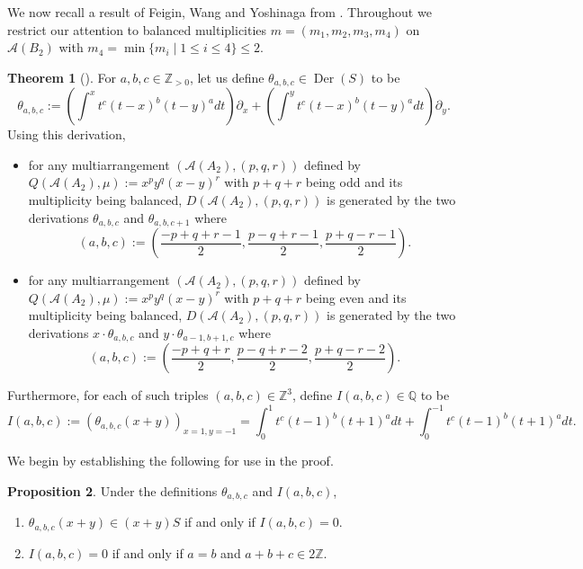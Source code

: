\documentclass[12pt]{amsart}
\theoremstyle{definition}
\newtheorem{theorem}{Theorem}[section]
\newtheorem{proposition}[theorem]{Proposition}
\theoremstyle{remark}
\newcommand{\Der}{\operatorname{Der}}
\newcommand\CA{{\mathscr A}}
\newcommand\ZZ{{\mathbb Z}}
\newcommand\QQ{{\mathbb Q}}
\begin{document}
We now recall a result of Feigin, Wang and Yoshinaga from \cite{2309.01287}. Throughout we restrict our attention to balanced multiplicities $m=(m_1,m_2,m_3,m_4)$ on $\CA(B_2)$ with $m_4=\min\{m_i\mid 1\leq i \leq 4\}\leq2$.
\begin{theorem}[{\cite[Thm.~2.3]{2309.01287}}]
    \label{theorem:FWY}
    For $a,b,c\in\ZZ_{>0}$, let us define $\theta_{a,b,c}\in\Der(S)$ to be 
    $$\theta_{a,b,c}:=\left(\int^{x} t^c(t-x)^b(t-y)^a dt\right) \partial_{x} 
    + \left(\int^{y} t^c(t-x)^b(t-y)^a dt\right) \partial_{y}.$$ 
    Using this derivation, 
    
    \begin{itemize}
        \item 
    for any multiarrangement $(\CA(A_2),(p,q,r))$ defined by $Q(\CA(A_2),\mu):={x}^p{y}^q(x-y)^r$ with $p+q+r$ being odd and its multiplicity being balanced, 
        $D(\CA(A_2),(p,q,r))$ is generated by the two derivations $\theta_{a,b,c}$ and $\theta_{a,b,c+1}$ where 
        $$(a,b,c):=(\frac{-p+q+r-1}{2},\frac{p-q+r-1}{2},\frac{p+q-r-1}{2}).$$ 

        \item
    for any multiarrangement $(\CA(A_2),(p,q,r))$ defined by $Q(\CA(A_2),\mu):={x}^p{y}^q(x-y)^r$ with $p+q+r$ being even and its multiplicity being balanced, 
        $D(\CA(A_2),(p,q,r))$ is generated by the two derivations $x\cdot\theta_{a,b,c}$ and $y\cdot\theta_{a-1,b+1,c}$ where 
        $$(a,b,c):=(\frac{-p+q+r}{2},\frac{p-q+r-2}{2},\frac{p+q-r-2}{2}).$$ 
    \end{itemize}
Furthermore, for each of such triples $(a,b,c)\in\ZZ^3$, define $I(a,b,c)\in\QQ$ to be 
$$I(a,b,c):=(\theta_{a,b,c}(x+y))_{x=1,y=-1}=\int^{1}_{0} t^c(t-1)^b(t+1)^a dt+\int^{-1}_{0} t^c(t-1)^b(t+1)^a dt.$$
\end{theorem}

We begin by establishing the following for use in the proof.

\begin{proposition}\label{proposition:differentialformula}
Under the definitions  $\theta_{a,b,c}$ and $I(a,b,c)$, 
\begin{enumerate}
    \item $\theta_{a,b,c}(x+y)\in(x+y)S$ if and only if $I(a,b,c)=0$.
    \item $I(a,b,c)=0$ if and only if $a=b$ and $a+b+c\in2\ZZ$.
\end{enumerate}
\end{proposition}
\end{document}
